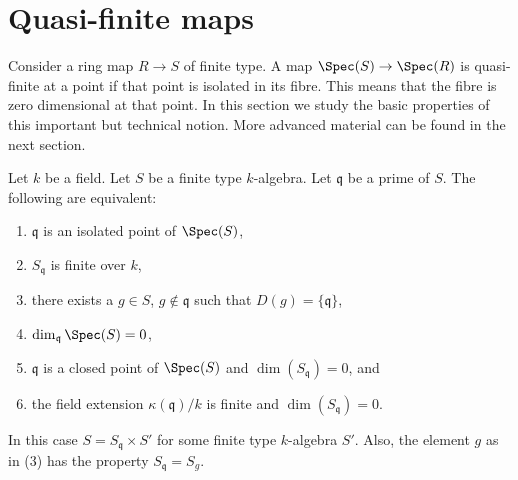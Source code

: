 \section{Quasi-finite maps}
\label{section-quasi-finite}

\noindent
Consider a ring map $R \to S$ of finite type.
A map $\Spec(S) \to \Spec(R)$ is quasi-finite
at a point if that point is isolated in its fibre.
This means that the fibre is zero dimensional at that point.
In this section we study the basic properties of this
important but technical notion. More advanced material
can be found in the next section.

\begin{lemma}
\label{lemma-isolated-point}
Let $k$ be a field.
Let $S$ be a finite type $k$-algebra.
Let $\mathfrak q$ be a prime of $S$.
The following are equivalent:
\begin{enumerate}
\item $\mathfrak q$ is an isolated point of $\Spec(S)$,
\item $S_{\mathfrak q}$ is finite over $k$,
\item there exists a $g \in S$, $g \not\in \mathfrak q$ such that
$D(g) = \{ \mathfrak q \}$,
\item $\dim_{\mathfrak q} \Spec(S) = 0$,
\item $\mathfrak q$ is a closed point of $\Spec(S)$ and
$\dim(S_{\mathfrak q}) = 0$, and
\item the field extension $\kappa(\mathfrak q)/k$ is finite
and $\dim(S_{\mathfrak q}) = 0$.
\end{enumerate}
In this case $S = S_{\mathfrak q} \times S'$ for some
finite type $k$-algebra $S'$. Also, the element $g$
as in (3) has the property $S_{\mathfrak q} = S_g$.
\end{lemma}

